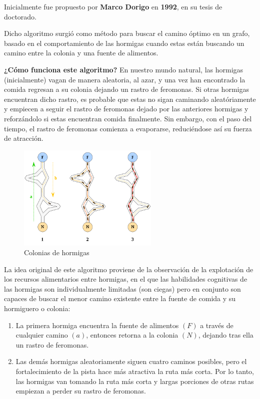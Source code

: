\documentclass[a4paper, 11pt]{article} %
\begin{document}
Inicialmente fue propuesto por \textbf{Marco Dorigo} en \textbf{1992}, en su tesis de doctorado.

Dicho algoritmo surgió como método para buscar el camino óptimo en un grafo, basado en el comportamiento de las hormigas cuando estas están buscando un camino entre la colonia y una fuente de alimentos.

\textbf{¿Cómo funciona este algoritmo?} En nuestro mundo natural, las hormigas (inicialmente) vagan de manera aleatoria, al azar, y una vez han encontrado la comida regresan a su colonia dejando un rastro de feromonas. Si otras hormigas encuentran dicho rastro, es probable que estas no sigan caminando aleatóriamente y empiecen a seguir el rastro de feromonas dejado por las anteriores hormigas y reforzándolo si estas encuentran comida finalmente. Sin embargo, con el paso del tiempo, el rastro de feromonas comienza a evaporarse, reduciéndose así su fuerza de atracción.

\begin{figure}[H]
\centering
\includegraphics[width=0.6\textwidth]{Hormigas.png}
\caption{Colonias de hormigas}
\label{Colonias de hormigas}
\end{figure}

La idea original de este algoritmo proviene de la observación de la explotación de los recursos alimentarios entre hormigas, en el que las habilidades cognitivas de las hormigas son individualmente limitadas (son ciegas) pero en conjunto son capaces de buscar el menor camino existente entre la fuente de comida y su hormiguero o colonia:

\begin{enumerate}
    \item La primera hormiga encuentra la fuente de alimentos $(F)$ a través de cualquier camino $(a)$, entonces retorna a la colonia $(N)$, dejando tras ella un rastro de feromonas.
    \item Las demás hormigas aleatoriamente siguen cuatro caminos posibles, pero el fortalecimiento de la pista hace más atractiva la ruta más corta. Por lo tanto, las hormigas van tomando la ruta más corta y largas porciones de otras rutas empiezan a perder su rastro de feromonas.
\end{enumerate}
\end{document}
